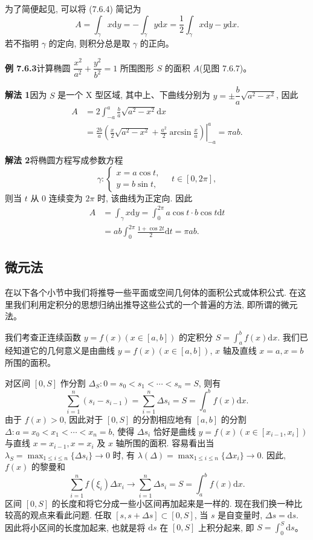 \documentclass[UTF8,12pt,a4paper,fontset=fandol]{ctexart}
\begin{document}
为了简便起见, 可以将 (7.6.4) 简记为
\[
  A=\int_\gamma x\mathrm dy=-\int_\gamma y\mathrm dx
  =\frac{1}{2}\int_\gamma x\mathrm dy-y\mathrm dx.
\]
若不指明 $\gamma$ 的定向, 则积分总是取 $\gamma$ 的正向。

\noindent\textbf{例 7.6.3}\quad 计算椭圆 $\dfrac{x^2}{a^2}+\dfrac{y^2}{b^2}=1$ 所围图形 $S$ 的面积 $A$(见图 7.6.7)。

\noindent\textbf{解法 1}\quad 因为 $S$ 是一个 X 型区域, 其中上、下曲线分别为 $y=\pm\dfrac{b}{a}\sqrt{a^2-x^2}$, 因此
\[
\begin{aligned}
  A&=2\int_{-a}^a\frac{b}{a}\sqrt{a^2-x^2}\mathrm dx\\
  &=\frac{2b}{a}\left.\left(\frac{x}{2}\sqrt{a^2-x^2}
  +\frac{a^2}{2}\arcsin\frac{x}{a}\right)\right|_{-a}^a
  =\pi ab.
\end{aligned}
\]

\noindent\textbf{解法 2}\quad 将椭圆方程写成参数方程
\[
  \gamma:
  \begin{cases}
    x=a\cos t,\\
    y=b\sin t,
  \end{cases}
  \quad t\in[0,2\pi],
\]
则当 $t$ 从 $0$ 连续变为 $2\pi$ 时, 该曲线为正定向. 因此
\[
\begin{aligned}
  A&=\int_\gamma x\mathrm dy
  =\int_0^{2\pi}a\cos t\cdot b\cos t\mathrm dt\\
  &=ab\int_0^{2\pi}\frac{1+\cos2t}{2}\mathrm dt
  =\pi ab.
\end{aligned}
\]

\subsection{微元法}

在以下各个小节中我们将推导一些平面或空间几何体的面积公式或体积公式. 在这里我们利用定积分的思想归纳出推导这些公式的一个普遍的方法, 即所谓的微元法。

我们考查正连续函数 $y=f(x)(x\in[a,b])$ 的定积分 $S=\int_a^b f(x)\mathrm dx$. 我们已经知道它的几何意义是由曲线 $y=f(x)(x\in[a,b])$, $x$ 轴及直线 $x=a,x=b$ 所围的面积。

对区间 $[0,S]$ 作分割 $\Delta_S:0=s_0<s_1<\cdots<s_n=S$, 则有
\begin{equation}
  \sum_{i=1}^n(s_i-s_{i-1})=\sum_{i=1}^n\Delta s_i=S=\int_a^b f(x)\mathrm dx.
  \tag{7.6.5}
\end{equation}
由于 $f(x)>0$, 因此对于 $[0,S]$ 的分割相应地有 $[a,b]$ 的分割 $\Delta:a=x_0<x_1<\cdots<x_n=b$, 使得 $\Delta s_i$ 恰好是曲线 $y=f(x)(x\in[x_{i-1},x_i])$ 与直线 $x=x_{i-1},x=x_i$ 及 $x$ 轴所围的面积. 容易看出当 $\lambda_S=\max_{1\leq i\leq n}\{\Delta s_i\}\to0$ 时, 有 $\lambda(\Delta)=\max_{1\leq i\leq n}\{\Delta x_i\}\to0$. 因此, $f(x)$ 的黎曼和
\begin{equation}
  \sum_{i=1}^n f(\xi_i)\Delta x_i\to\sum_{i=1}^n\Delta s_i=S=\int_a^b f(x)\mathrm dx.
  \tag{7.6.6}
\end{equation}
区间 $[0,S]$ 的长度和将它分成一些小区间再加起来是一样的. 现在我们换一种比较高的观点来看此问题. 任取 $[s,s+\Delta s]\subset[0,S]$, 当 $s$ 是自变量时, $\Delta s=\mathrm ds$. 因此将小区间的长度加起来, 也就是将 $\mathrm ds$ 在 $[0,S]$ 上积分起来, 即 $S=\int_0^S\mathrm ds$。
\end{document}
